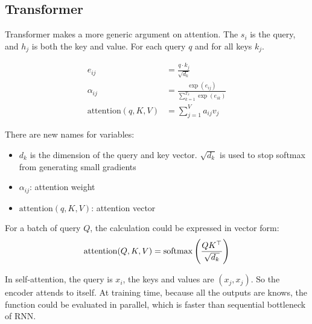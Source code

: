 \subsection{Transformer}

\begin{definition}
    Transformer makes a more generic argument on attention. The $s_i$ is the query, and $h_j$ is both the key and value. For each query $q$ and for all keys $k_j$.

\begin{equation}
    \begin{aligned}
        e_{ij} &= \frac{q \cdot k_j}{\sqrt{d_k}} \\
        \alpha_{ij} &= \frac{\exp(e_{ij})}{\displaystyle \sum_{k=1}^{T_x} \exp(e_{ik})} \\
        \mathrm{attention}(q, K, V) &= \sum_{j=1}^{V} a_{ij} v_j
    \end{aligned}
\end{equation}

There are new names for variables:
\begin{itemize}
    \item $d_k$ is the dimension of the query and key vector. $\sqrt{d_k}$ is used to stop softmax from generating small gradients
    \item $\alpha_{ij}$: attention weight
    \item $\mathrm{attention}(q, K, V)$: attention vector
\end{itemize}

For a batch of query $Q$, the calculation could be expressed in vector form:
\begin{equation}
    \mathrm{attention}(Q, K, V) = \mathrm{softmax}\left( \frac{Q {K}^\top}{\sqrt{d_k}} \right)
\end{equation}
\end{definition}


\begin{definition}
    In self-attention, the query is $x_i$, the keys and values are $(x_j, x_j)$. So the encoder attends to itself. At training time, because all the outputs are knows, the function could be evaluated in parallel, which is faster than sequential bottleneck of RNN.
\end{definition}

